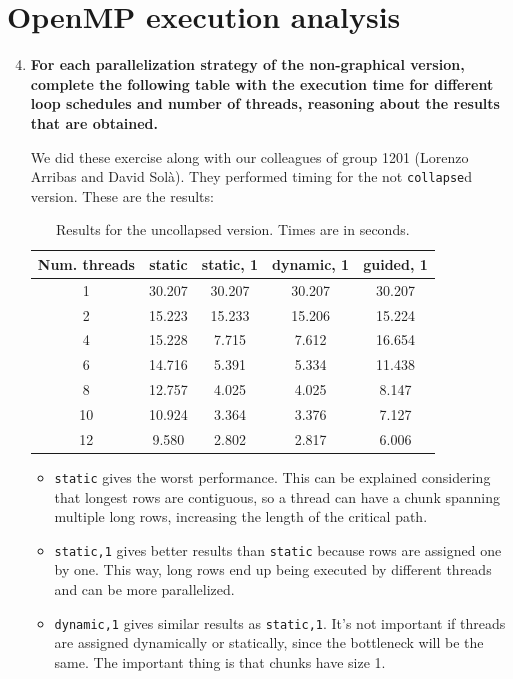 \documentclass[a4paper,11pt]{article}
\newcommand{\answerspace}{\vspace{0.5cm}}
\begin{document}
\section{OpenMP execution analysis}
\begin{enumerate}
\setcounter{enumi}{3}
\item
\textbf{For each parallelization strategy of the non-graphical version, complete the following table with
    the execution time for different loop schedules and number of threads, reasoning about the results
    that are obtained.}

\answerspace
We did these exercise along with our colleagues of group 1201 (Lorenzo
Arribas and David Solà). They performed timing for the not \texttt{collapse}d version.
These are the results:

\begin{table}[h]
\begin{tabular}{| c || c | c | c | c |}
\hline
\textbf{Num. threads} & \textbf{static} & \textbf{static, 1} & \textbf{dynamic, 1} & \textbf{guided, 1}
\\
\hline
\hline
1 & 30.207 & 30.207 & 30.207 & 30.207
\\
\hline
2 & 15.223 & 15.233 & 15.206 & 15.224
\\
\hline
4 & 15.228 & 7.715 & 7.612 & 16.654
\\
\hline
6 & 14.716 & 5.391 & 5.334 & 11.438
\\
\hline
8 & 12.757 & 4.025 & 4.025 & 8.147
\\
\hline
10 & 10.924 & 3.364 & 3.376 & 7.127
\\
\hline
12 & 9.580 & 2.802 & 2.817 & 6.006
\\
\hline
\end{tabular}
\caption{Results for the uncollapsed version. Times are in seconds.}
\end{table}

\begin{itemize}
\item \texttt{static} gives the worst performance. This can be explained considering that
longest rows are contiguous, so a thread can have a chunk spanning multiple long
rows, increasing the length of the critical path.

\item \texttt{static,1} gives better results than \texttt{static} because rows are
  assigned one by one. This way, long rows end up being executed by different threads
  and can be more parallelized.

\item \texttt{dynamic,1} gives similar results as \texttt{static,1}. It's not important
  if threads are assigned dynamically or statically, since the bottleneck will be the same.
  The important thing is that chunks have size 1.


\end{itemize}
\end{enumerate}
\end{document}
